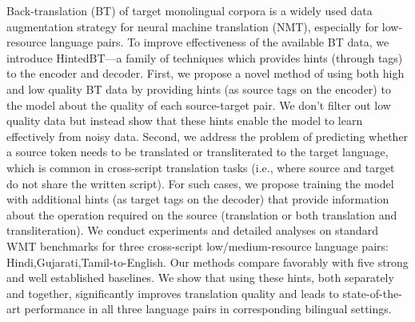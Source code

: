 Back-translation (BT) of target monolingual corpora is a widely used data augmentation strategy for neural machine translation (NMT), especially for low-resource language pairs.  To improve effectiveness of the available BT data, we introduce HintedBT---a family of techniques which provides hints (through tags) to the encoder and decoder. First, we propose a novel method of using both high and low quality BT data by providing hints (as source tags on the encoder) to the model about the quality of each source-target pair. We don't filter out low quality data but instead show that these hints enable the model to learn effectively from noisy data. Second, we address the  problem of predicting whether a source token needs to be translated or transliterated to the target language, which is common in cross-script translation tasks (i.e., where source and target do not share the written script). For such cases, we propose training the model with additional hints (as target tags on the decoder) that provide information about the operation required on the source (translation or both translation and transliteration). We conduct experiments and detailed analyses on standard WMT benchmarks for three cross-script low/medium-resource language pairs: {Hindi,Gujarati,Tamil}-to-English. Our methods compare favorably with five strong and well established baselines. We show that using these hints, both separately and together, significantly improves translation quality and leads to state-of-the-art performance in all three language pairs in corresponding bilingual settings.
